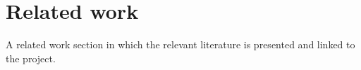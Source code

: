 \chapter{Related work}
A related work section in which the relevant literature is presented and linked to the project.